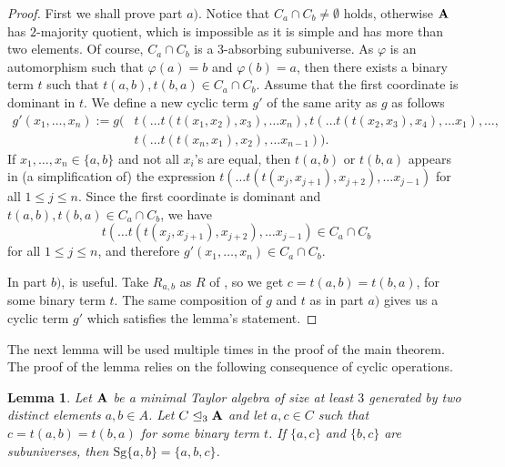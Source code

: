 \documentclass[11pt]{amsart}
\newcommand{\m}[1]{\mathbf{\uppercase{#1}}}
\newtheorem{lem}[thm]{Lemma}
\theoremstyle{definition}
\theoremstyle{remark}
\theoremstyle{plain}
\begin{document}
\begin{proof}

First we shall prove part $a)$. Notice that $C_a\cap C_b\not= \emptyset$ holds, otherwise $\m a$ has $2$-majority quotient, which is impossible as it is simple and has more than two elements. Of course, $C_a\cap C_b$ is a 3-absorbing subuniverse. As $\varphi$ is an automorphism such that $\varphi (a)=b$ and $\varphi (b)=a$, then there exists a binary term $t$ such that $t(a,b), t(b,a)\in C_a\cap C_b$. Assume that the first coordinate is dominant in $t$. We define a new cyclic term $g'$ of the same arity as $g$ as follows
\begin{align*}
g'(x_1,\dotso, x_n) := g(&t(\dotso t(t(x_1,x_2),x_3),\dotso x_n), t(\dotso t(t(x_2,x_3),x_4),\dotso x_1),\dotso ,\\
& t(\dotso t(t(x_n,x_1),x_2),\dotso x_{n-1})).
\end{align*}
If $x_1,\dots,x_n\in \{a,b\}$ and not all $x_i$'s are equal, then $t(a,b)$ or $t(b,a)$ appears in (a simplification of) the expression $t(\dotso t(t(x_j,x_{j+1}),x_{j+2}),\dotso x_{j-1})$ for all $1\leqslant j\leqslant n$. Since the first coordinate is dominant and $t(a,b), t(b,a)\in C_a\cap C_b$, we have $$t(\dotso t(t(x_j,x_{j+1}),x_{j+2}),\dotso x_{j-1})\in C_a\cap C_b$$ for all $1\leqslant j\leqslant n$, and therefore $g'(x_1,\dotso ,x_n)\in C_a\cap C_b$.

In part $b)$,  is useful. Take $R_{a,b}$ as $R$ of , so we get $c=t(a,b)=t(b,a)$, for some binary term $t$. The same composition of $g$ and $t$ as in part $a)$ gives us a cyclic term $g'$ which satisfies the lemma's statement.
\end{proof}


The next lemma will be used multiple times in the proof of the main theorem. The proof of the lemma relies on the following consequence of cyclic operations.



\begin{lem}\label{3elem}
Let ${\m A}$ be a minimal Taylor algebra of size at least $3$ generated by two distinct elements $a,b\in A$. Let $C\trianglelefteq_3 {\m A}$ and let $a,c\in C$ such that $c=t(a,b)=t(b,a)$ for some binary term $t$. If $\{a,c\}$ and $\{b,c\}$ are subuniverses, then $\mathrm{Sg}\{a,b\}=\{a,b,c\}$.
\end{lem}
\end{document}
